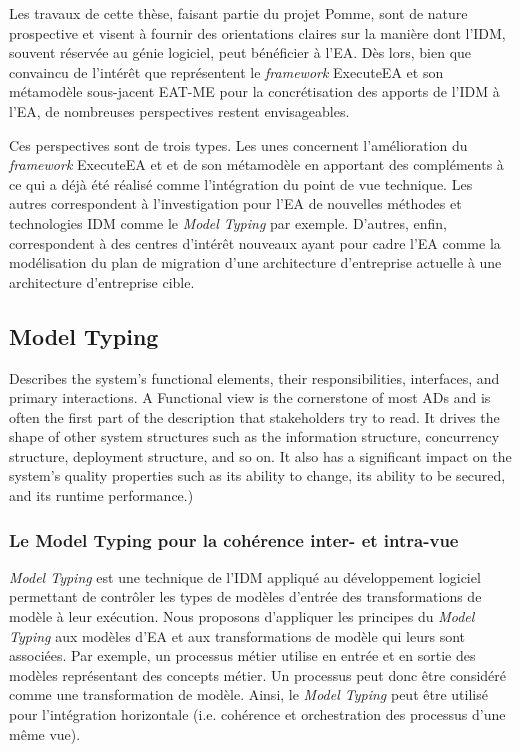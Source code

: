 Les travaux de cette thèse, faisant partie du projet Pomme, sont de nature prospective et visent à fournir 
des orientations claires sur la manière dont l'IDM, souvent réservée au génie logiciel, peut bénéficier à l'EA.
Dès lors, bien que convaincu de l'intérêt que représentent le \emph{framework} ExecuteEA et son métamodèle sous-jacent
EAT-ME pour la concrétisation des apports de l'IDM à l'EA, de nombreuses perspectives restent envisageables.

Ces perspectives sont de trois types. Les unes concernent l'amélioration du \emph{framework} ExecuteEA et 
et de son métamodèle en apportant des compléments à ce qui a déjà été réalisé comme l'intégration
du point de vue technique. Les autres correspondent à l'investigation pour l'EA
de nouvelles méthodes et technologies IDM comme le \emph{Model Typing} par exemple. D'autres, enfin,
correspondent à des centres d'intérêt nouveaux ayant pour cadre l'EA comme la modélisation du plan de migration
d'une architecture d'entreprise actuelle à une architecture d'entreprise cible.



    \subsection{Model Typing}

 Describes the system’s functional elements, their responsibilities,
interfaces, and primary interactions. A Functional view is the cornerstone of
most ADs and is often the first part of the description that stakeholders try
to read. It drives the shape of other system structures such as the information
structure, concurrency structure, deployment structure, and so on. It also has a 
significant impact on the system’s quality properties such as its ability to
change, its ability to be secured, and its runtime performance.) 

\subsubsection{Le Model Typing pour la cohérence inter- et intra-vue}

\textit{Model Typing} est une technique de l'IDM appliqué au développement
logiciel permettant de contrôler les types de modèles d'entrée des
transformations de modèle à leur exécution. Nous proposons d'appliquer les
principes du \textit{Model Typing} aux modèles d'EA et aux transformations de
modèle qui leurs sont associées. Par exemple, un processus métier utilise en
entrée et en sortie des modèles représentant des concepts métier. Un processus
peut donc être considéré comme une transformation de modèle. Ainsi, le
\textit{Model Typing} peut être utilisé pour l'intégration horizontale (i.e.
cohérence et orchestration des processus d'une même vue).



